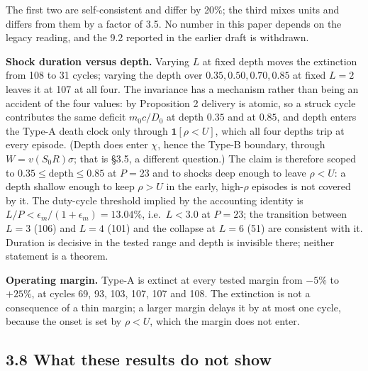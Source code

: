 \documentclass[11pt,a4paper]{article}
\begin{document}
The first two are self-consistent and differ by 20\%; the third mixes units and
differs from them by a factor of 3.5. No number in this paper depends on the
legacy reading, and the 9.2 reported in the earlier draft is withdrawn.

\textbf{Shock duration versus depth.} Varying \(L\) at fixed depth moves the extinction
from 108 to 31 cycles; varying the depth over \(0.35,0.50,0.70,0.85\) at fixed
\(L=2\) leaves it at 107 at all four. The invariance has a mechanism rather than
being an accident of the four values: by Proposition 2 delivery is atomic, so a
struck cycle contributes the same deficit \(m_0c/D_0\) at depth \(0.35\) and at
\(0.85\), and depth enters the Type-A death clock only through
\(\mathbf{1}[\rho<U]\), which all four depths trip at every episode. (Depth does
enter \(\chi\), hence the Type-B boundary, through \(W=v(S_0R)\sigma\); that is
§3.5, a different question.) The claim is therefore scoped to
\(0.35\le\text{depth}\le0.85\) at \(P=23\) and to shocks deep enough to leave
\(\rho<U\): a depth shallow enough to keep \(\rho>U\) in the early, high-\(\rho\)
episodes is not covered by it. The duty-cycle threshold implied by the accounting
identity is \(L/P<\epsilon_m/(1+\epsilon_m)=13.04\%\), i.e.~\(L<3.0\) at \(P=23\); the
transition between \(L=3\) (106) and \(L=4\) (101) and the collapse at \(L=6\) (51) are
consistent with it. Duration is decisive in the tested range and depth is
invisible there; neither statement is a theorem.

\textbf{Operating margin.} Type-A is extinct at every tested margin from \(-5\%\) to
\(+25\%\), at cycles 69, 93, 103, 107, 107 and 108. The extinction is not a
consequence of a thin margin; a larger margin delays it by at most one cycle,
because the onset is set by \(\rho<U\), which the margin does not enter.

\subsection{3.8 What these results do not show}\label{what-these-results-do-not-show}
\end{document}
